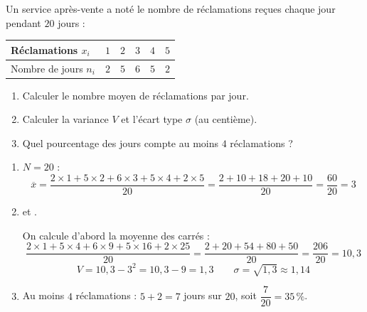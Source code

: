 
\newcommand{\R}{\mathbb{R}}
\newcommand{\vect}[1]{\overrightarrow{#1}}

Un service après-vente a noté le nombre de réclamations reçues chaque jour pendant $20$ jours :
\begin{center}
\begin{tabular}{|l|c|c|c|c|c|}\hline
Réclamations $x_i$ & $1$ & $2$ & $3$ & $4$ & $5$ \\\hline
Nombre de jours $n_i$ & $2$ & $5$ & $6$ & $5$ & $2$ \\\hline
\end{tabular}\end{center}
\begin{enumerate}
  \item Calculer le nombre moyen de réclamations par jour.
  \item Calculer la variance $V$ et l'écart type $\sigma$ (au centième).
  \item Quel pourcentage des jours compte au moins $4$ réclamations ?
\end{enumerate}

\begin{enumerate}[itemsep=14pt]
  \item $N=20$ :
  \[\overline x=\dfrac{2\times1+5\times2+6\times3+5\times4+2\times5}{20}=\dfrac{2+10+18+20+10}{20}=\dfrac{60}{20}=3\]

  \item
  \begin{prop}
   \quad et \quad {}.
  \end{prop}
  On calcule d'abord la moyenne des carrés :
  \[\dfrac{2\times1+5\times4+6\times9+5\times16+2\times25}{20}=\dfrac{2+20+54+80+50}{20}=\dfrac{206}{20}=10{,}3\]
  \[V=10{,}3-3^2=10{,}3-9=1{,}3\qquad\sigma=\sqrt{1{,}3}\approx1{,}14\]

  \item Au moins $4$ réclamations : $5+2=7$ jours sur $20$, soit $\dfrac{7}{20}=35\,\%$.
\end{enumerate}
